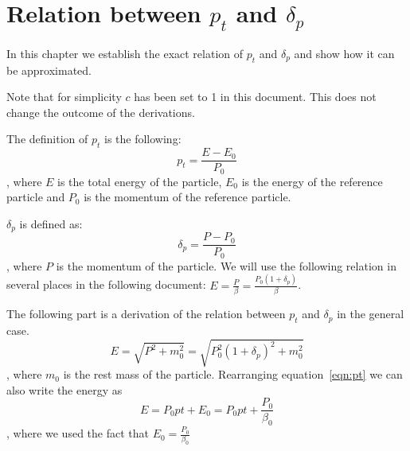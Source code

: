 \chapter{Relation between $p_t$ and $\delta _p$}
\label{chap:pt_rel_dp}
In this chapter we establish the exact relation of $p_t$ and $\delta _p$ and show how it can be approximated. 

Note that for simplicity $c$ has been set to 1 in this document. This does not change the outcome of the derivations. 


The definition of $p_t$ is the following:
\begin{equation}
    p_t = \frac{E-E_0}{P_0}
        \label{eqn:pt}
\end{equation}
, where $E$ is the total energy of the particle, $E_0$ is the energy of the reference particle and $P_0$ is the momentum of the reference particle. 

$\delta_p$ is defined as:
\begin{equation}
    \delta_p = \frac{P-P_0}{P_0}
\end{equation}
, where $P$ is the momentum of the particle. 
We will use the following relation in several places in the following document:
$E=\frac{P}{\beta} = \frac{P_0(1+\delta _p)}{\beta}$. 

The following part is a derivation of the relation between $p_t$ and $\delta_p$ in the general case. 
\begin{equation}
    E = \sqrt{P^2+m_0^2}= \sqrt{P_0^2(1+\delta _p)^2+m_0^2}
    \label{eqn:e1}
\end{equation}
, where $m_0$ is the rest mass of the particle. 
Rearranging equation~\ref{eqn:pt} we can also write the energy as
\begin{equation}
    E = P_0 pt + E_0 = P_0 pt + \frac{P_0}{\beta _0}
    \label{eqn:e2}
\end{equation}
, where we used the fact that $ E_0 =\frac{P_0}{\beta _0}$

